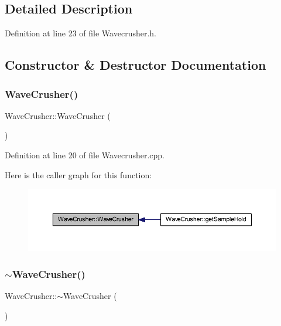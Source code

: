 \subsection{Detailed Description}


Definition at line 23 of file Wavecrusher.\+h.



\subsection{Constructor \& Destructor Documentation}
\mbox{\label{class_wave_crusher_a3e0ce1e58ad9fe4ab8a18fb6ecdb0db2}} 
\subsubsection{\texorpdfstring{Wave\+Crusher()}{WaveCrusher()}}
{\footnotesize\ttfamily Wave\+Crusher\+::\+Wave\+Crusher (\begin{DoxyParamCaption}{ }\end{DoxyParamCaption})}



Definition at line 20 of file Wavecrusher.\+cpp.

Here is the caller graph for this function\+:
\nopagebreak
\begin{figure}[H]
\begin{center}
\leavevmode
\includegraphics[width=350pt]{df/d70/class_wave_crusher_a3e0ce1e58ad9fe4ab8a18fb6ecdb0db2_icgraph}
\end{center}
\end{figure}
\mbox{\label{class_wave_crusher_a464c498c7a7219aa92ba30b3951dc282}} 
\subsubsection{\texorpdfstring{$\sim$\+Wave\+Crusher()}{~WaveCrusher()}}
{\footnotesize\ttfamily Wave\+Crusher\+::$\sim$\+Wave\+Crusher (\begin{DoxyParamCaption}{ }\end{DoxyParamCaption})}



